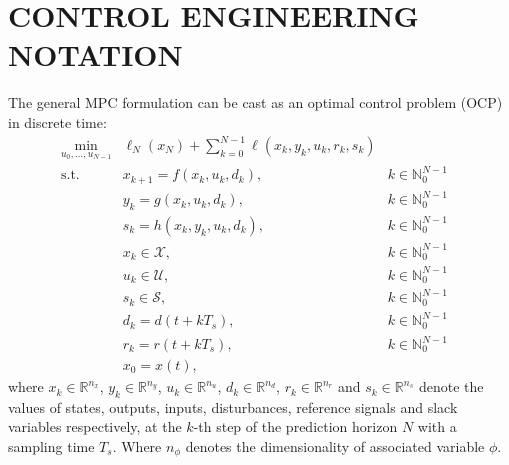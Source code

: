 \documentclass[10pt]{extarticle}
\begin{document}
\section{CONTROL ENGINEERING NOTATION}\label{sec:control_notation}

The general MPC formulation can be cast as an optimal control problem (OCP) in discrete time:
\begin{subequations}
	\label{eq:mpc_general_formal}
	\begin{align}
	\min_{u_0, \ldots, u_{N-1}} & \ell_N(x_N) + \sum_{k=0}^{N-1} \ell(x_k, y_k, u_k, r_k, s_k) &
	\label{eq:mpc_general_formal:cost}\\
	\text{s.t.} \ & x_{k+1} = f(x_k, u_k, d_k),  & k \in \mathbb{N}_{0}^{N-1} & \label{eq:mpc_general_formal:xp} \\
	& y_{k} = g(x_k, u_k, d_k),  & k \in \mathbb{N}_{0}^{N-1} & \label{eq:mpc_general_formal:yp} \\
	& s_{k} = h(x_k, y_k, u_k, d_k),  & k \in \mathbb{N}_{0}^{N-1} & \label{eq:mpc_general_formal:s} \\
	&  x_{k} \in \mathcal{X},  & k \in \mathbb{N}_{0}^{N-1}   \label{eq:mpc_general_formal:xb}\\
	& u_{k} \in \mathcal{U}, & k \in \mathbb{N}_{0}^{N-1} 
	\label{eq:mpc_general_formal:ub}\\
	& s_{k} \in \mathcal{S}, & k \in \mathbb{N}_{0}^{N-1} 
	\label{eq:mpc_general_formal:sb}\\
    & d_k = d(t + k T_s),  & k \in \mathbb{N}_{0}^{N-1} \label{eq:mpc_general_formal:d0} \\
    & r_k = r(t + k T_s),  & k \in \mathbb{N}_{0}^{N-1} \label{eq:mpc_general_formal:r0} \\
	& x_0 = x(t),\label{eq:mpc_general_formal:x0} 
	\end{align}
\end{subequations}
where $x_k \in \mathbb{R}^{n_x}$, $y_k \in \mathbb{R}^{n_y}$, $u_k \in \mathbb{R}^{n_u}$, $d_k \in \mathbb{R}^{n_d}$, $r_k \in \mathbb{R}^{n_r}$ and $s_k \in \mathbb{R}^{n_s}$ denote the values of states, outputs,
inputs, disturbances, reference signals and slack variables respectively, at the $k$-th step of the prediction horizon $N$ with a sampling time $T_s$. 
Where $n_{\phi}$ denotes the dimensionality of associated variable $\phi$.
\end{document}
